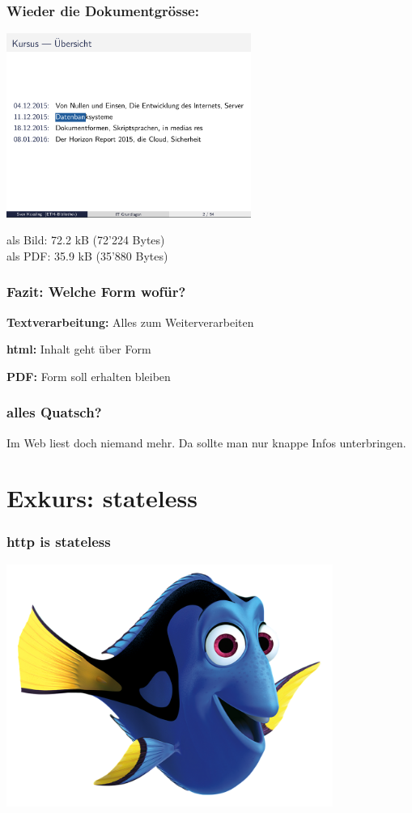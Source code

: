 \begin{frame}
\frametitle{Wieder die Dokumentgrösse:}
  \begin{center}
    \includegraphics[width=0.6\textwidth]{pics/copy-paste.png}

    als Bild: 72.2 kB (72'224 Bytes)\\
    als PDF: 35.9 kB (35'880 Bytes)
  \end{center}
\end{frame}

\begin{frame}
\frametitle{Fazit: Welche Form wofür?}
    \textbf{Textverarbeitung:} Alles zum Weiterverarbeiten

    \textbf{html:} Inhalt geht über Form

    \textbf{PDF:} Form soll erhalten bleiben
\end{frame}

\begin{frame}
\frametitle{alles Quatsch?}
\begin{theorem}
  Im Web liest doch niemand mehr. Da sollte man nur knappe Infos unterbringen.
\end{theorem}
\end{frame}

\section{Exkurs: stateless}
\begin{frame}
\frametitle{http is stateless}
  \includegraphics[width=0.8\textwidth]{pics/whatsyournameagain}
\end{frame}


